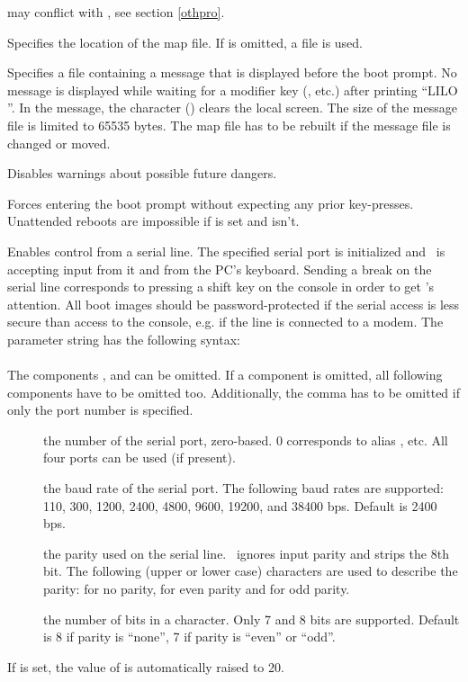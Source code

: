 \begin{description}
     may conflict with , see section \ref{othpro}.
  \item[\craw{map=}\meta{map\_file}] Specifies the location of the map file.
    If  is omitted, a file  is used.
  \item[\craw{message=}\meta{message\_file}] Specifies a file containing a
    message that is displayed before the boot prompt. No message is displayed
    while waiting for a modifier key (, etc.) after printing
    ``LILO ''. In the message, the 
    character (\hbox{}) clears the local screen. The size of the
    message file is limited to 65535 bytes. The map file has to be rebuilt
    if the message file is changed or moved.
  \item[\craw{nowarn}] Disables warnings about possible future dangers.
  \item[\craw{prompt}] Forces entering the boot prompt without expecting any
    prior key-presses. Unattended reboots are impossible if  is
    set and  isn't.
  \item[\craw{serial=}\meta{parameters}] Enables control from a serial line.
    The specified serial port is initialized and \LILO\ is accepting input from
    it and from the PC's keyboard. Sending a break on the serial line
    corresponds to pressing a shift key on the console in order to get
    \LILO's attention. All boot images should be password-protected if the
    serial access is less secure than access to the console, e.g. if the
    line is connected to a modem. The parameter string has the following
    syntax: \\
     \\
    The components ,  and  can be
    omitted. If a component is omitted, all following components have to
    be omitted too. Additionally, the comma has to be omitted if only the
    port number is specified.
    \begin{description}
      \item[] the number of the serial port, zero-based. 0
	corresponds to  alias , etc. All four
	ports can be used (if present).
      \item[] the baud rate of the serial port. The following
	baud rates are supported: 110, 300, 1200, 2400, 4800, 9600, 19200, and
        38400 bps. Default is 2400 bps.
      \item[] the parity used on the serial line. \LILO\ ignores
	input parity and strips the 8th bit. The following (upper or lower
	case) characters are used to describe the parity:  for no
	parity,  for even parity and  for odd parity.
      \item[] the number of bits in a character. Only 7 and 8
	bits are supported. Default is 8 if parity is ``none'', 7 if parity
	is ``even'' or ``odd''.
    \end{description}
    If  is set, the value of  is automatically raised
    to 20.


\end{description}
